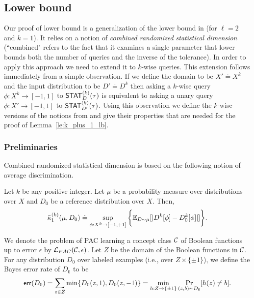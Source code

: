 \subsection{Lower bound}
Our proof of lower bound is a generalization of the lower bound in \cite{Feldman:16sqd} (for $\ell=2$ and $k=1$). It relies on a notion of {\em combined randomized statistical dimension} (``combined" refers to the fact that it examines a single parameter that lower bounds both the number of queries and the inverse of the tolerance).
In order to apply this approach we need to extend it to $k$-wise queries. This extension follows immediately from a simple observation. If we define the domain to be $X' \doteq X^k$ and the input distribution to be $D' \doteq D^k$ then asking a $k$-wise query $\phi:X^k \to [-1,1]$ to $\mathsf{STAT}^{(k)}_D(\tau)$ is equivalent to asking a unary query $\phi: X' \to [-1,1]$ to $\mathsf{STAT}^{(k)}_{D'}(\tau)$. Using this observation we define the $k$-wise versions of the notions from \cite{Feldman:16sqd} and give their properties that are needed for the proof of Lemma~\ref{le:k_plus_1_lb}.

\subsubsection{Preliminaries}
Combined randomized statistical dimension is based on the following notion of average discrimination.
\begin{defn}\label{def:kappa_1_disc}
Let $k$ be any positive integer. Let $\mu$ be a probability measure over distributions over $X$ and $D_0$ be a reference distribution over $X$. Then,
$$ \bar{\kappa}_1^{(k)}(\mu,D_0) \doteq \sup_{\phi: X^k \to [-1,+1]} \bigg\{ \mathbb E_{D \sim \mu}[|D^k[\phi]-D_0^k[\phi]|] \bigg\}. $$
\end{defn}

We denote the problem of PAC learning a concept class $\mathcal{C}$ of Boolean functions up to error $\epsilon$ by $\mathcal{L}_{PAC}(\mathcal{C},\epsilon)$. Let $Z$ be the domain of the Boolean functions in $\mathcal{C}$. For any distribution $D_0$ over labeled examples (i.e., over $Z \times \{\pm 1\}$), we define the Bayes error rate of $D_0$ to be
\begin{equation*}
\mathsf{err}(D_0) = \displaystyle\sum\limits_{z \in Z} \min\{D_0(z,1) , D_0(z,-1)\} = \min_{h: Z \to \{\pm1 \}} \Pr_{(z,b) \sim D_0}[h(z) \neq b].
\end{equation*}

